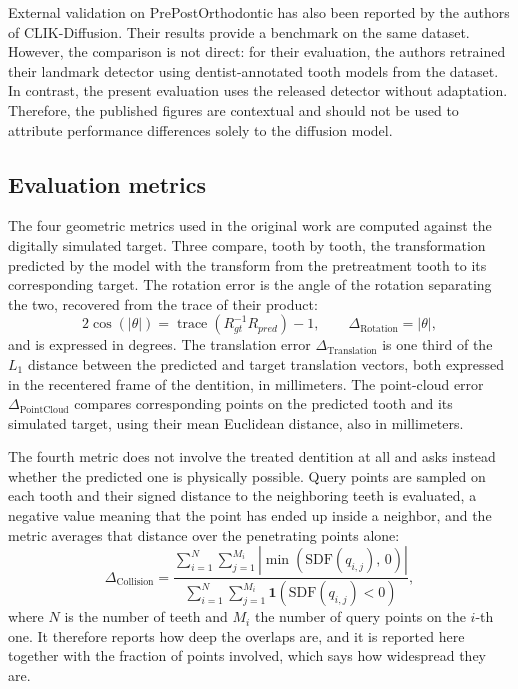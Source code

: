 \documentclass[10pt,a4paper]{article}
\begin{document}
External validation on PrePostOrthodontic has also been reported by the authors of CLIK-Diffusion. Their results provide a benchmark on the same dataset. However, the comparison is not direct: for their evaluation, the authors retrained their landmark detector using dentist-annotated tooth models from the dataset. In contrast, the present evaluation uses the released detector without adaptation. Therefore, the published figures are contextual and should not be used to attribute performance differences solely to the diffusion model.


\subsection{Evaluation metrics}
\label{sec:metrics}

The four geometric metrics used in the original work are computed against the digitally simulated target. Three compare, tooth by tooth, the transformation predicted by the model with the transform from the pretreatment tooth to its corresponding target. The rotation error is the angle of the rotation separating the two, recovered from the trace of their product:
\begin{equation}
2\cos(\lvert\theta\rvert) = \operatorname{trace}\!\left(R_{gt}^{-1}R_{pred}\right) - 1,
\qquad \Delta_{\text{Rotation}} = \lvert\theta\rvert,
\end{equation}
and is expressed in degrees. The translation error $\Delta_{\text{Translation}}$ is one third of the $L_1$ distance between the predicted and target translation vectors, both expressed in the recentered frame of the dentition, in millimeters. The point-cloud error $\Delta_{\text{PointCloud}}$ compares corresponding points on the predicted tooth and its simulated target, using their mean Euclidean distance, also in millimeters.

The fourth metric does not involve the treated dentition at all and asks instead whether the predicted one is physically possible. Query points are sampled on each tooth and their signed distance to the neighboring teeth is evaluated, a negative value meaning that the point has ended up inside a neighbor, and the metric averages that distance over the penetrating points alone:
\begin{equation}
\Delta_{\text{Collision}} = \frac{\sum_{i=1}^{N}\sum_{j=1}^{M_i}\left\lvert\min\!\left(\mathrm{SDF}(q_{i,j}),\,0\right)\right\rvert}
{\sum_{i=1}^{N}\sum_{j=1}^{M_i}\mathbf{1}\!\left(\mathrm{SDF}(q_{i,j}) < 0\right)},
\end{equation}
where $N$ is the number of teeth and $M_i$ the number of query points on the $i$-th one. It therefore reports how deep the overlaps are, and it is reported here together with the fraction of points involved, which says how widespread they are.
\end{document}
